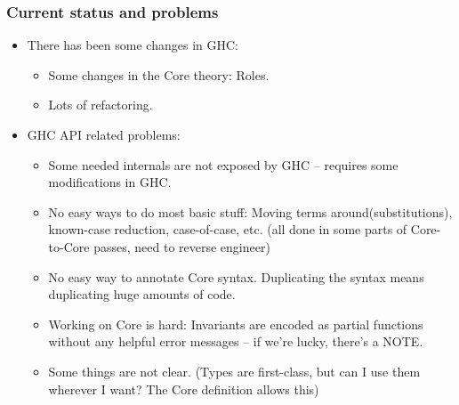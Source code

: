 \documentclass{beamer}
\begin{document}
\begin{frame}
    \frametitle{Current status and problems}

    \begin{itemize}
        \item[]
            There has been some changes in GHC:

            \begin{itemize}
                \item
                    Some changes in the Core theory: Roles.
                \item
                    Lots of refactoring.
            \end{itemize}

        \item[]
            GHC API related problems:

            \begin{itemize}
                \item
                    Some needed internals are not exposed by GHC -- requires
                    some modifications in GHC.
                \item
                    No easy ways to do most basic stuff: Moving terms
                    around(substitutions), known-case reduction, case-of-case,
                    etc.  (all done in some parts of Core-to-Core passes, need
                    to reverse engineer)
                \item
                    No easy way to annotate Core syntax. Duplicating the syntax
                    means duplicating huge amounts of code.
                \item
                    Working on Core is hard: Invariants are encoded as partial
                    functions without any helpful error messages -- if we're
                    lucky, there's a NOTE.
                \item
                    Some things are not clear. (Types are first-class, but can I
                    use them wherever I want? The Core definition allows this)
            \end{itemize}

    \end{itemize}
\end{frame}
\end{document}
